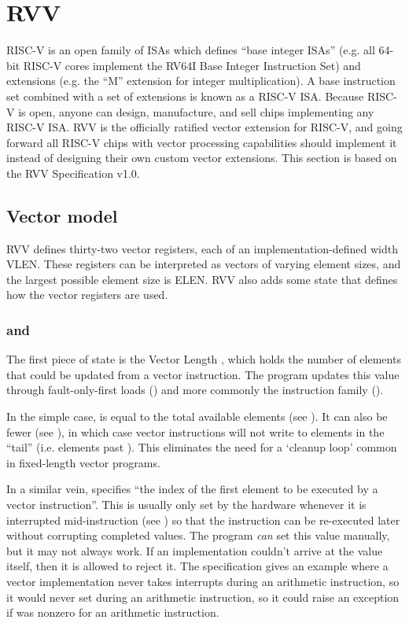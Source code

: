 \section{RVV}\label{chap:bg:sec:rvv}
RISC-V is an open family of ISAs which defines ``base integer ISAs'' (e.g. all 64-bit RISC-V cores implement the RV64I Base Integer Instruction Set) and extensions (e.g. the ``M'' extension for integer multiplication).
A base instruction set combined with a set of extensions is known as a RISC-V ISA.
Because RISC-V is open, anyone can design, manufacture, and sell chips implementing any RISC-V ISA.
RVV is the officially ratified vector extension for RISC-V, and going forward all RISC-V chips with vector processing capabilities should implement it instead of designing their own custom vector extensions.
This section is based on the RVV Specification v1.0.

\subsection{Vector model}
RVV defines thirty-two vector registers, each of an implementation-defined width VLEN.
These registers can be interpreted as vectors of varying element sizes, and the largest possible element size is ELEN.
RVV also adds some state that defines how the vector registers are used.

\subsubsection{ and }
The first piece of state is the Vector Length , which holds the number of elements that could be updated from a vector instruction.
The program updates this value through fault-only-first loads () and more commonly the  instruction family ().

In the simple case,  is equal to the total available elements (see ).
It can also be fewer (see ), in which case vector instructions will not write to elements in the \enquote{tail} (i.e. elements past ).
This eliminates the need for a `cleanup loop' common in fixed-length vector programs.

In a similar vein,  specifies \enquote{the index of the first element to be executed by a vector instruction}.
This is usually only set by the hardware whenever it is interrupted mid-instruction (see ) so that the instruction can be re-executed later without corrupting completed values.
The program \emph{can} set this value manually, but it may not always work.
If an implementation couldn't arrive at the value itself, then it is allowed to reject it.
The specification gives an example where a vector implementation never takes interrupts during an arithmetic instruction, so it would never set  during an arithmetic instruction, so it could raise an exception if  was nonzero for an arithmetic instruction.

